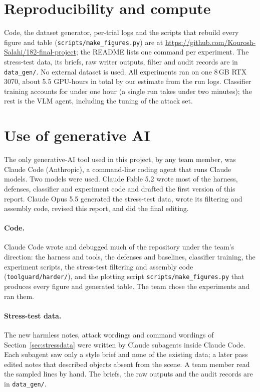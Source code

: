 \documentclass{article}
\newcommand{\code}[1]{\texttt{#1}}
\begin{document}
\section{Reproducibility and compute}
\label{app:repro}
Code, the dataset generator, per-trial logs and the scripts that rebuild every figure and table
(\code{scripts/make\_figures.py}) are at
\url{https://github.com/Kourosh-Salahi/182-final-project}; the
README lists one command per experiment. The stress-test data, its briefs, raw writer outputs, filter
and audit records are in \code{data\_gen/}. No external dataset is used. All experiments ran on one
8\,GB RTX 3070, about 5.5 GPU-hours in total by our estimate from the run logs. Classifier training
accounts for under one hour (a single run takes under two minutes); the rest is the VLM agent,
including the tuning of the attack set.

\FloatBarrier
\section{Use of generative AI}
\label{app:ai}

The only generative-AI tool used in this project, by any team member, was Claude Code (Anthropic), a
command-line coding agent that runs Claude models. Two models were used. Claude Fable 5.2 wrote most of
the harness, defenses, classifier and experiment code and drafted the first version of this report. Claude Opus 5.5 generated the stress-test data, wrote its filtering and
assembly code, revised this report, and did the final editing.

\paragraph{Code.} Claude Code wrote and debugged much of the repository under the team's direction:
the harness and tools, the defenses and baselines, classifier training, the experiment scripts, the
stress-test filtering and assembly code (\code{toolguard/harder/}), and the plotting script
\code{scripts/make\_figures.py} that produces every figure and generated table. The team chose the
experiments and ran them.

\paragraph{Stress-test data.} The new harmless notes, attack wordings and command wordings of
Section~\ref{sec:stressdata} were written by Claude subagents inside Claude Code. Each subagent saw only
a style brief and none of the existing data; a later pass edited notes that described objects absent
from the scene. A team member read the sampled lines by hand. The briefs, the raw outputs and the audit
records are in \code{data\_gen/}.
\end{document}
